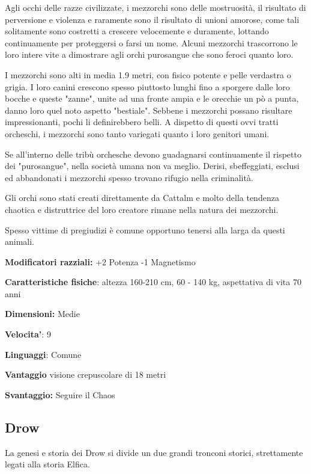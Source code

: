 \documentclass[a4paper,11pt,twoside,openany]{book}
\begin{document}
\label{mezzorco}

Agli occhi delle razze civilizzate, i mezzorchi sono delle mostruosità, il risultato di perversione e violenza e raramente sono il risultato di unioni amorose, come tali solitamente sono costretti a crescere velocemente e duramente, lottando continuamente per proteggersi o farsi un nome. Alcuni mezzorchi trascorrono le loro intere vite a dimostrare agli orchi purosangue che sono feroci quanto loro.

I mezzorchi sono alti in media 1.9 metri, con fisico potente e pelle verdastra o grigia. I loro canini crescono spesso piuttosto lunghi fino a sporgere dalle loro bocche e queste "zanne", unite ad una fronte ampia e le orecchie un pò a punta, danno loro quel noto aspetto "bestiale". Sebbene i mezzorchi possano risultare impressionanti, pochi li definirebbero belli. A dispetto di questi ovvi tratti orcheschi, i mezzorchi sono tanto variegati quanto i loro genitori umani.

Se all'interno delle tribù orchesche devono guadagnarsi continuamente il rispetto dei "purosangue", nella società umana non va meglio. Derisi, sbeffeggiati, esclusi ed abbandonati i mezzorchi spesso trovano rifugio nella criminalità.

Gli orchi sono stati creati direttamente da Cattalm e molto della tendenza chaotica e distruttrice del loro creatore rimane nella natura dei mezzorchi.

Spesso vittime di pregiudizi è comune opportuno tenersi alla larga da questi animali.

\textbf{Modificatori razziali:} +2 Potenza -1 Magnetismo

\textbf{Caratteristiche fisiche}: altezza 160-210 cm, 60 - 140 kg,
aspettativa di vita 70 anni

\textbf{Dimensioni:} Medie

\textbf{Velocita'}: 9

\textbf{Linguaggi}: Comune

\textbf{Vantaggio} visione crepuscolare di 18 metri

\textbf{Svantaggio:} Seguire il Chaos

\subsection{Drow}

\label{drow}

La genesi e storia dei Drow si divide un due grandi tronconi storici, strettamente legati alla storia Elfica.
\end{document}
